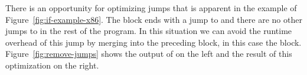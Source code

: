 \documentclass[11pt]{book}
\newtheorem{exercise}[theorem]{Exercise}
\begin{document}
{%




There is an opportunity for optimizing jumps that is apparent in the
example of Figure~\ref{fig:if-example-x86}. The  block
ends with a jump to  and there are no other jumps to
 in the rest of the program. In this situation we can
avoid the runtime overhead of this jump by merging 
into the preceding block, in this case the  block.
Figure~\ref{fig:remove-jumps} shows the output of
 on the left and the result of this
optimization on the right.

}
\end{document}
